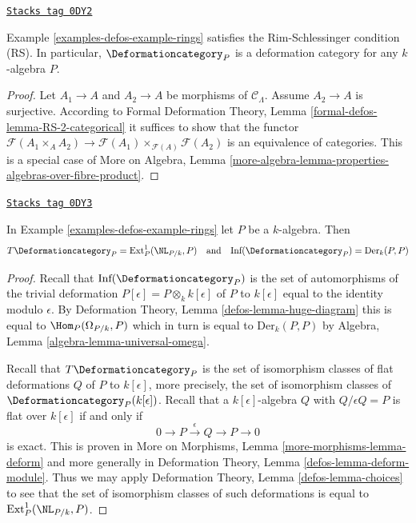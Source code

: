 \begin{lemma}[Rings RS]
\label{examples-defos-lemma-rings-RS}
\href{https://stacks.math.columbia.edu/tag/0DY2}{\texttt{Stacks tag 0DY2}}

Example \ref{examples-defos-example-rings}
satisfies the Rim-Schlessinger condition (RS).
In particular, $\Deformationcategory_P$ is a deformation category
for any $k$-algebra $P$.
\end{lemma}

\begin{proof}
Let $A_1 \to A$ and $A_2 \to A$ be morphisms of $\mathcal{C}_\Lambda$.
Assume $A_2 \to A$ is surjective. According to
Formal Deformation Theory, Lemma
\ref{formal-defos-lemma-RS-2-categorical}
it suffices to show that the functor
$\mathcal{F}(A_1 \times_A A_2) \to
\mathcal{F}(A_1) \times_{\mathcal{F}(A)} \mathcal{F}(A_2)$
is an equivalence of categories.
This is a special case of More on Algebra, Lemma
\ref{more-algebra-lemma-properties-algebras-over-fibre-product}.
\end{proof}

\begin{lemma}[Rings TI]
\label{examples-defos-lemma-rings-TI}
\href{https://stacks.math.columbia.edu/tag/0DY3}{\texttt{Stacks tag 0DY3}}

In Example \ref{examples-defos-example-rings} let $P$ be a $k$-algebra. Then
$$
T\Deformationcategory_P = \text{Ext}^1_P(\NL_{P/k}, P)
\quad\text{and}\quad
\text{Inf}(\Deformationcategory_P) = \text{Der}_k(P, P)
$$
\end{lemma}

\begin{proof}
Recall that $\text{Inf}(\Deformationcategory_P)$ is the set of
automorphisms of the trivial deformation
$P[\epsilon] = P \otimes_k k[\epsilon]$ of $P$ to $k[\epsilon]$
equal to the identity modulo $\epsilon$.
By Deformation Theory, Lemma \ref{defos-lemma-huge-diagram}
this is equal to $\Hom_P(\Omega_{P/k}, P)$ which in turn is
equal to $\text{Der}_k(P, P)$ by
Algebra, Lemma \ref{algebra-lemma-universal-omega}.

\medskip\noindent
Recall that $T\Deformationcategory_P$ is the set of isomorphism classes
of flat deformations $Q$ of $P$ to $k[\epsilon]$, more precisely,
the set of isomorphism classes of $\Deformationcategory_P(k[\epsilon])$.
Recall that a $k[\epsilon]$-algebra $Q$ with $Q/\epsilon Q = P$
is flat over $k[\epsilon]$ if and only if
$$
0 \to P \xrightarrow{\epsilon} Q \to P \to 0
$$
is exact. This is proven in More on Morphisms, Lemma
\ref{more-morphisms-lemma-deform} and more generally in
Deformation Theory, Lemma \ref{defos-lemma-deform-module}.
Thus we may apply
Deformation Theory, Lemma \ref{defos-lemma-choices}
to see that the set of isomorphism classes of such
deformations is equal to $\text{Ext}^1_P(\NL_{P/k}, P)$.
\end{proof}

